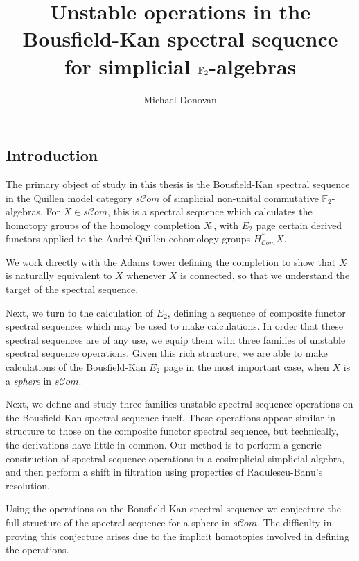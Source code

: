 \documentclass[11pt]{amsart} \renewcommand{\baselinestretch}{1.4}
\title[The Bousfield-Kan spectral sequence for simplicial algebras]{Unstable operations in the Bousfield-Kan spectral sequence for simplicial $\Ftwo$-algebras}
\author[M.\ Donovan]{Michael Donovan}
\theoremstyle{plain}
\theoremstyle{definition}
\newcommand{\scrC}{\mathscr{C}}
\newcommand{\F}{\mathbb{F}}
\newcommand{\algs}{{\scrC\!\textit{om}}}
\newcommand{\Ftwo}{\F_2}
\begin{document}
\begin{Contents Page}
\maketitle
\ifx\PostponeContents\undefined{\tableofcontents \hfil\pagebreak }\else\relax\fi
\end{Contents Page}


\begin{Introduction}
\section{\textbf{Introduction}}

The primary object of study in this thesis is the Bousfield-Kan spectral sequence in the Quillen model category $s\algs$ of simplicial non-unital commutative  $\Ftwo$-algebras. For  $X\in s\algs$, this is a spectral sequence which calculates the homotopy groups of the homology completion $X\hat{\ }$, with $E_2$ page certain derived functors applied to the Andr\'e-Quillen cohomology groups $H^*_{\algs}X$. 

We work directly with the Adams tower defining the completion to show that $X\hat{\ }$ is naturally equivalent to $X$ whenever $X$ is connected, so that we understand the target of the spectral sequence.

Next, we turn to the calculation of $E_2$, defining a sequence of composite functor spectral sequences which may be used to make calculations. In order that these spectral sequences are of any use, we equip them with three families of unstable spectral sequence operations. Given this rich structure, we are able to make calculations of the Bousfield-Kan $E_2$ page in the most important case, when $X$ is a \emph{sphere} in $s\algs$.

Next, we define and study three families unstable spectral sequence operations on the Bousfield-Kan spectral sequence itself. These operations appear similar in structure to those on the composite functor spectral sequence, but technically, the derivations have little in common. Our method is to perform a generic construction of spectral sequence operations in a cosimplicial simplicial algebra, and then perform a shift in filtration using properties of Radulescu-Banu's resolution.

Using the operations on the Bousfield-Kan spectral sequence we conjecture the full structure of the spectral sequence for a sphere in $s\algs$. The difficulty in proving this conjecture arises due to the implicit homotopies involved in defining the operations.


\end{Introduction}
\end{document}
